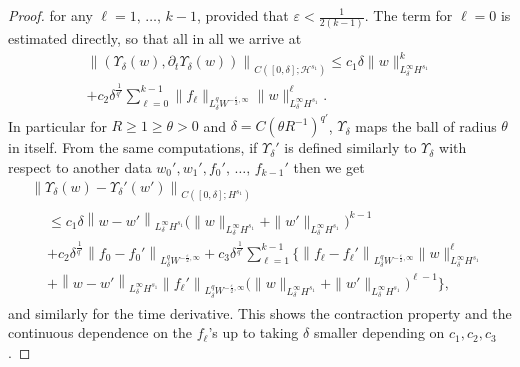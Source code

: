 \documentclass[10pt]{amsart}
\theoremstyle{definition}\newtheorem{defi}[theo]{Definition}\newtheorem{rema}[theo]{Remark}\newtheorem{exam}[theo]{Example}\newtheorem{exem}[theo]{Example}\newtheorem{nota}[theo]{Notation}
\renewcommand{\H}{\mathcal{H}}
\newcommand{\dl}{\delta}
\newcommand{\eps}{\varepsilon}
\newcommand{\dt}{\partial_t}
\begin{document}
\begin{proof}
for any $\ell=1,\,\dots,\,k-1$, provided that $\eps<\frac1{2(k-1)}$. The term for $\ell=0$ is estimated directly, so that all in all we arrive at
\begin{multline*}
\left\|\left(\Upsilon_{\dl}(w),\dt\Upsilon_\dl(w)\right)\right\|_{C\left([0,\dl]; \H^{s_1}\right)} \leq c_1\dl\|w\|_{L^{\infty}_{\dl} H^{s_1}}^{k}\\
+c_2\dl^{\frac1{q'}}\sum_{\ell=0}^{k-1}\|f_{\ell}\|_{L^{q}_{\dl}W^{-\frac\eps2,\infty}}\|w\|_{L^{\infty}_{\dl} H^{s_1}}^{\ell}.
\end{multline*}
In particular for $ R\geq 1\geq \theta>0$ and $\dl=C(\theta R^{-1})^{q'}$, $\Upsilon_{\dl}$ maps the ball of radius $\theta$ in itself. From the same computations, if $\Upsilon_{\dl}'$ is defined similarly to $\Upsilon_{\dl}$ with respect to another data $w_0',w_1',f_0',\,\dots,\,f_{k-1}'$ then we get
\begin{multline}\label{diff-Upsilon}
\left\|\Upsilon_{\dl}(w)-\Upsilon_{\dl}'(w')\right\|_{C\left([0,\dl]; H^{s_1}\right)}\\
\begin{aligned}
& \leq c_1\dl\left\|w-w'\right\|_{L^{\infty}_{\dl} H^{s_1}}\big(\|w\|_{L^{\infty}_{\dl} H^{s_1}}+\|w'\|_{L^{\infty}_{\dl} H^{s_1}}\big)^{k-1}\\
&+c_2\dl^{\frac1{q'}}\left\|f_{0}-f_{0}'\right\|_{L^{q}_{\dl}W^{-\frac\eps2,\infty}}+c_3\dl^{\frac1{q'}}\sum_{\ell=1}^{k-1}\Big\{\left\|f_{\ell}-f_{\ell}'\right\|_{L^{q}_{\dl}W^{-\frac\eps2,\infty}}\|w\|_{L^{\infty}_{\dl} H^{s_1}}^{\ell}\\
&+\left\|w-w'\right\|_{L^{\infty}_{\dl} H^{s_1}}\left\|f_{\ell}'\right\|_{L^{q}_{\dl}W^{-\frac\eps2,\infty}}\big(\|w\|_{L^{\infty}_{\dl} H^{s_1}}+\|w'\|_{L^{\infty}_{\dl} H^{s_1}}\big)^{\ell-1}\Big\},
\end{aligned}
\end{multline}
and similarly for the time derivative. This shows the contraction property and the continuous dependence on the $f_{\ell}$'s up to taking $\dl$ smaller depending on $c_1,c_2,c_3$.
\end{proof}
\end{document}
